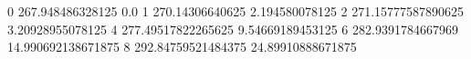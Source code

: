 0 267.948486328125 0.0
1 270.14306640625 2.194580078125
2 271.15777587890625 3.20928955078125
4 277.49517822265625 9.54669189453125
6 282.9391784667969 14.990692138671875
8 292.84759521484375 24.89910888671875
